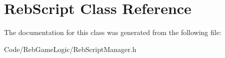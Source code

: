 \hypertarget{class_reb_script}{}\section{Reb\+Script Class Reference}
\label{class_reb_script}


The documentation for this class was generated from the following file\+:\begin{DoxyCompactItemize}
\item 
Code/\+Reb\+Game\+Logic/Reb\+Script\+Manager.\+h\end{DoxyCompactItemize}
